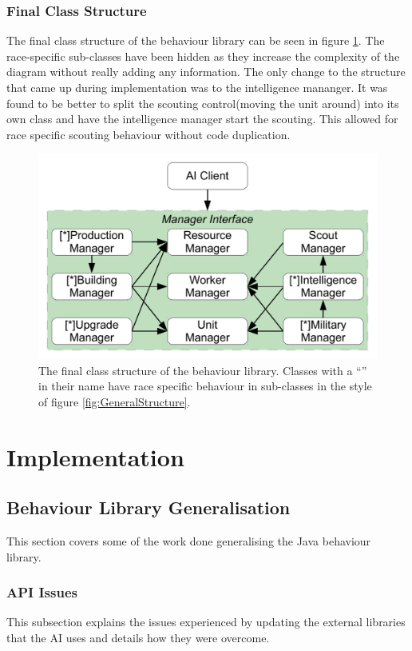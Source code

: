 \documentclass[11pt,openright,a4paper]{report}
\begin{document}
\subsection{Final Class Structure}
The final class structure of the behaviour library can be seen in figure \ref{fig:ClassDia}. The race-specific sub-classes have been hidden as they increase the complexity of the diagram without really adding any information. The only change to the structure that came up during implementation was to the intelligence mananger. It was found to be better to split the scouting control(moving the unit around) into its own class and have the intelligence manager start the scouting. This allowed for race specific scouting behaviour without code duplication.
\begin{figure}[h]
    \centering
    \includegraphics[scale=0.5]{ClassDia}
    \caption{The final class structure of the behaviour library. Classes with a ``\lbrack*\rbrack'' in their name have race specific behaviour in sub-classes in the style of figure \ref{fig:GeneralStructure}.}
    \label{fig:ClassDia}
\end{figure}

\chapter{Implementation}
\label{Implementation}

\section{Behaviour Library Generalisation}
This section covers some of the work done generalising the Java behaviour library.
\subsection{API Issues}
\label{APIIssue}
This subsection explains the issues experienced by updating the external libraries that the AI uses and details how they were overcome.
\end{document}
